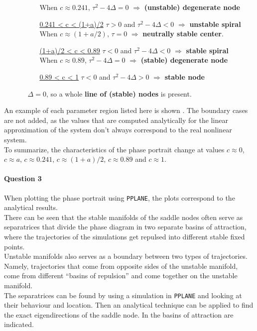 \documentclass[a4paper,11pt]{article}
\begin{document}
\begin{itemize}
\begin{itemize}
\begin{itemize}[leftmargin=20mm]
															When $c\approx0.241$, $\tau^2-4\Delta=0$ $\Rightarrow$ \textbf{(unstable) degenerate node}
               												\item[\underline{0.241 < c < (1+a)/2}] $\tau>0$ and $\tau^2-4\Delta<0$ $\Rightarrow$ \textbf{unstable spiral}\\
															   When $c\approx(1+a/2)$, $\tau=0$ $\Rightarrow$ \textbf{neutrally stable center}.
															\item[\underline{(1+a)/2 < c < 0.89}] $\tau<0$ and $\tau^2-4\Delta<0$ $\Rightarrow$ \textbf{stable spiral}\\
															When $c\approx0.89$, $\tau^2-4\Delta=0$ $\Rightarrow$ \textbf{(stable) degenerate node}
															\item[\underline{0.89 < c < 1}] $\tau<0$ and $\tau^2-4\Delta>0$ $\Rightarrow$ \textbf{stable node}\\
														\end{itemize}
   			\item[\boxed{\mathbf{c\approx 1}}  ] $\Delta=0$, so a whole \textbf{line of (stable) nodes} is present.\\
		\end{itemize}
\end{itemize}
An example of each parameter region listed here is shown . The boundary cases are not added, as the values that are computed analytically 
for the linear approximation of the system don't always correspond to the real nonlinear system.\\
To summarize, the characteristics of the phase portrait change at values $c\approx0$, $c\approx a$, $c\approx0.241$, $c\approx(1+a)/2$, $c\approx0.89$ and $c \approx1$.

\paragraph{Question 3}\; When plotting the phase portrait using \texttt{PPLANE}, the plots correspond to the analytical results.\\
There can be seen that the stable manifolds of the saddle nodes often serve as separatrices that divide the phase diagram in two separate basins
of attraction, where the trajectories of the simulations get repulsed into different stable fixed points.\\
Unstable manifolds also serves as a boundary between two types of trajectories. Namely, trajectories that come from opposite sides of the unstable manifold, come from different
``basins of repulsion'' and come together on the unstable manifold.\\
The separatrices can be found by using a simulation in \texttt{PPLANE} and looking at their behaviour and location. Then an analytical technique can be applied to find the 
exact eigendirections of the saddle node. In  the basins of attraction are indicated.
\end{document}
